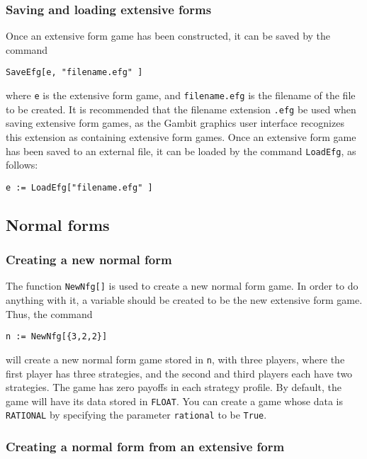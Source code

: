 \subsubsection{Saving and loading extensive forms}

Once an extensive form game has been constructed, it can be saved by
the command 

\begin{verbatim}
SaveEfg[e, "filename.efg" ]
\end{verbatim}

\noindent where \verb+e+ is the extensive form game, and \verb+filename.efg+ is
the filename of the file to be created.  It is recommended that the
filename extension \verb+.efg+ be used when saving extensive form
games, as the Gambit graphics user interface recognizes this extension
as containing extensive form games.  Once an extensive form game has
been saved to an external file, it can be loaded by the command
\verb+LoadEfg+, as follows:

\begin{verbatim}
e := LoadEfg["filename.efg" ]
\end{verbatim}

\subsection{Normal forms}

\subsubsection{Creating a new normal form}

The function \verb+NewNfg[]+ is used to create a new normal form game.
In order to do anything with it, a variable should be created to be
the new extensive form game.  Thus, the command

\begin{verbatim}
n := NewNfg[{3,2,2}]
\end{verbatim}

\noindent 
will create a new normal form game stored in \verb+n+, with three players, where
the first player has three strategies, and the second and third
players each have two strategies.  The game has zero payoffs in each
strategy profile.  By default, the game will have its data stored in
\verb+FLOAT+.  You can create a game whose data is \verb+RATIONAL+
by specifying the parameter \verb+rational+ to be \verb+True+.

\subsubsection{Creating a normal form from an extensive form}

